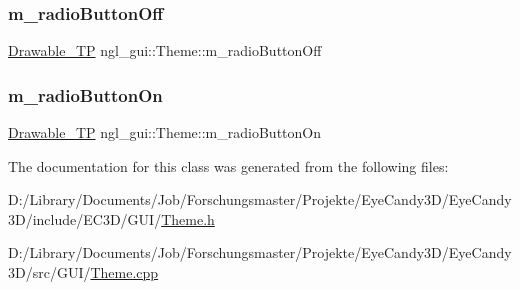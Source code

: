 \mbox{\label{classngl__gui_1_1_theme_a90a227c59aeb62fd64aaed7427911d95}} 
\subsubsection{\texorpdfstring{m\+\_\+radio\+Button\+Off}{m\_radioButtonOff}}
{\footnotesize\ttfamily \mbox{\hyperlink{classngl__gui_1_1_theme_a43741a39898ef4b14443b980a2e6d67c}{Drawable\+\_\+\+TP}} ngl\+\_\+gui\+::\+Theme\+::m\+\_\+radio\+Button\+Off}

\mbox{\label{classngl__gui_1_1_theme_a604c0933d4676666dc312f0a108267e5}} 
\subsubsection{\texorpdfstring{m\+\_\+radio\+Button\+On}{m\_radioButtonOn}}
{\footnotesize\ttfamily \mbox{\hyperlink{classngl__gui_1_1_theme_a43741a39898ef4b14443b980a2e6d67c}{Drawable\+\_\+\+TP}} ngl\+\_\+gui\+::\+Theme\+::m\+\_\+radio\+Button\+On}



The documentation for this class was generated from the following files\+:\begin{DoxyCompactItemize}
\item 
D\+:/\+Library/\+Documents/\+Job/\+Forschungsmaster/\+Projekte/\+Eye\+Candy3\+D/\+Eye\+Candy3\+D/include/\+E\+C3\+D/\+G\+U\+I/\mbox{\hyperlink{_theme_8h}{Theme.\+h}}\item 
D\+:/\+Library/\+Documents/\+Job/\+Forschungsmaster/\+Projekte/\+Eye\+Candy3\+D/\+Eye\+Candy3\+D/src/\+G\+U\+I/\mbox{\hyperlink{_theme_8cpp}{Theme.\+cpp}}\end{DoxyCompactItemize}
